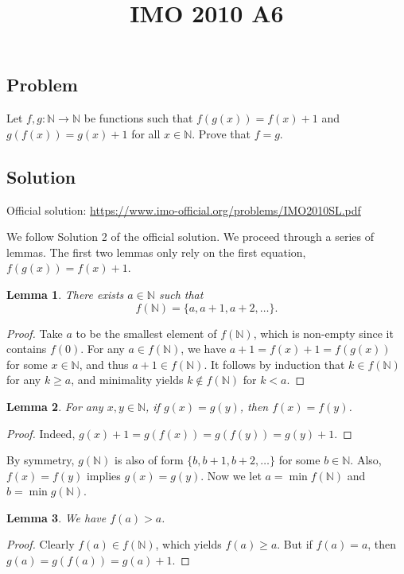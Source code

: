 \documentclass{article}
\title{IMO 2010 A6}
\author{}
\date{}
\newcommand{\N}{\mathbb{N}}
\newtheorem{lemma}{Lemma}
\begin{document}
\maketitle



\subsection*{Problem}

Let $f, g : \N \to \N$ be functions such that $f(g(x)) = f(x) + 1$ and $g(f(x)) = g(x) + 1$ for all $x \in \N$.
Prove that $f = g$.



\subsection*{Solution}

Official solution: \url{https://www.imo-official.org/problems/IMO2010SL.pdf}

We follow Solution 2 of the official solution.
We proceed through a series of lemmas.
The first two lemmas only rely on the first equation, $f(g(x)) = f(x) + 1$.

\begin{lemma}\label{2010a6-1}
There exists $a \in \N$ such that
\[ f(\N) = \{a, a + 1, a + 2, \ldots\}. \]
\end{lemma}
\begin{proof}
Take $a$ to be the smallest element of $f(\N)$, which is non-empty since it contains $f(0)$.
For any $a \in f(\N)$, we have $a + 1 = f(x) + 1 = f(g(x))$ for some $x \in \N$, and thus $a + 1 \in f(\N)$.
It follows by induction that $k \in f(\N)$ for any $k \geq a$, and minimality yields $k \notin f(\N)$ for $k < a$.
\end{proof}

\begin{lemma}\label{2010a6-2}
For any $x, y \in \N$, if $g(x) = g(y)$, then $f(x) = f(y)$.
\end{lemma}
\begin{proof}
Indeed, $g(x) + 1 = g(f(x)) = g(f(y)) = g(y) + 1$.
\end{proof}

By symmetry, $g(\N)$ is also of form $\{b, b + 1, b + 2, \ldots\}$ for some $b \in \N$.
Also, $f(x) = f(y)$ implies $g(x) = g(y)$.
Now we let $a = \min f(\N)$ and $b = \min g(\N)$.

\begin{lemma}\label{2010a6-3}
We have $f(a) > a$.
\end{lemma}
\begin{proof}
Clearly $f(a) \in f(\N)$, which yields $f(a) \geq a$.
But if $f(a) = a$, then $g(a) = g(f(a)) = g(a) + 1$.
\end{proof}
\end{document}
